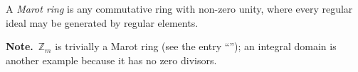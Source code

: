 \documentclass[12pt]{article}
\theoremstyle{definition}
\begin{document}
A {\em Marot ring} is any commutative ring with non-zero unity, where every regular ideal may be generated by regular elements.

\textbf{Note.}\, $\mathbb{Z}_m$ is trivially a Marot ring (see the entry ``''); an integral domain is another example because it has no zero divisors. %
\end{document}
